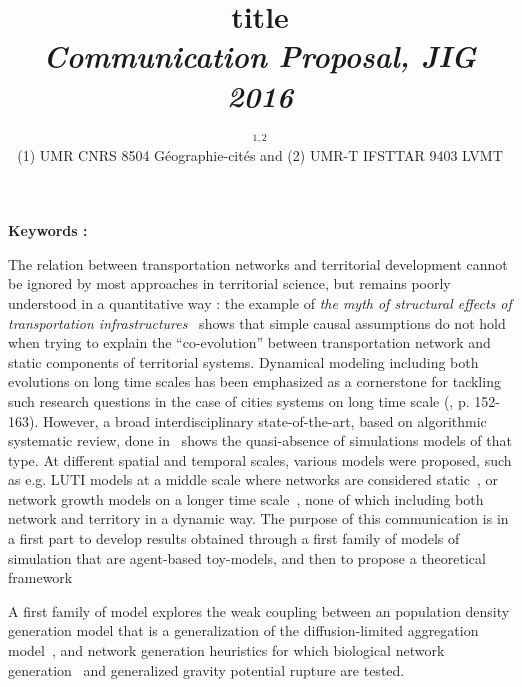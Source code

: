 


\title{\vspace{-2.5cm}title\\\medskip
\textit{Communication Proposal, JIG 2016}
}
\author{\small{}$^{1,2}$\\
\small(1) UMR CNRS 8504 Géographie-cités and (2) UMR-T IFSTTAR 9403 LVMT
}
\date{}

\maketitle

\justify


\textbf{Keywords : }\textit{}

\medskip

The relation between transportation networks and territorial development cannot be ignored by most approaches in territorial science, but remains poorly understood in a quantitative way : the example of \emph{the myth of structural effects of transportation infrastructures}~\cite{offner1993effets} shows that simple causal assumptions do not hold when trying to explain the ``co-evolution'' between transportation network and static components of territorial systems. Dynamical modeling including both evolutions on long time scales has been emphasized as a cornerstone for tackling such research questions in the case of cities systems on long time scale (\cite{bretagnolle:tel-00459720}, p. 152-163). However, a broad interdisciplinary state-of-the-art, based on algorithmic systematic review, done in~\cite{raimbault2015models} shows the quasi-absence of simulations models of that type. At different spatial and temporal scales, various models were proposed, such as e.g. LUTI models at a middle scale where networks are considered static~\cite{iacono2008models}, or network growth models on a longer time scale~\cite{xie2009modeling}, none of which including both network and territory in a dynamic way. The purpose of this communication is in a first part to develop results obtained through a first family of models of simulation that are agent-based toy-models, and then to propose a theoretical framework

A first family of model explores the weak coupling between an population density generation model that is a generalization of the diffusion-limited aggregation model~\cite{batty2006hierarchy}, and network generation heuristics for which biological network generation~\cite{tero2006physarum} and generalized gravity potential rupture are tested.



